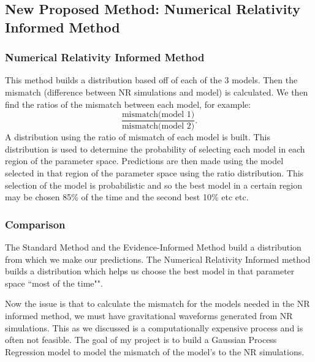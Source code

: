 \documentclass{article}
\begin{document}
\subsection*{New Proposed Method: Numerical Relativity Informed Method \cite{hoy2024multi}}

\subsubsection*{Numerical Relativity Informed Method}
This method builds a distribution based off of each of the 3 models. Then the mismatch (difference between NR simulations and model) is calculated. We then find the ratios of the mismatch between each model, for example:
\[
\frac{\text{mismatch(model 1)}}{\text{mismatch(model 2)}}.
\]
A distribution using the ratio of mismatch of each model is built. This distribution is used to determine the probability of selecting each model in each region of the parameter space. Predictions are then made using the model selected in that region of the parameter space using the ratio distribution. This selection of the model is probabilistic and so the best model in a certain region may be chosen 85\% of the time and the second best 10\% etc etc.

\subsubsection*{Comparison}
The Standard Method and the Evidence-Informed Method build a distribution from which we make our predictions. The Numerical Relativity Informed method builds a distribution which helps us choose the best model in that parameter space ``most of the time"".

\noindent
Now the issue is that to calculate the mismatch for the models needed in the NR informed method, we must have gravitational waveforms generated from NR simulations. This as we discussed is a computationally expensive process and is often not feasible. The goal of my project is to build a Gaussian Process Regression model to model the mismatch of the model's to the NR simulations.

\end{document}
